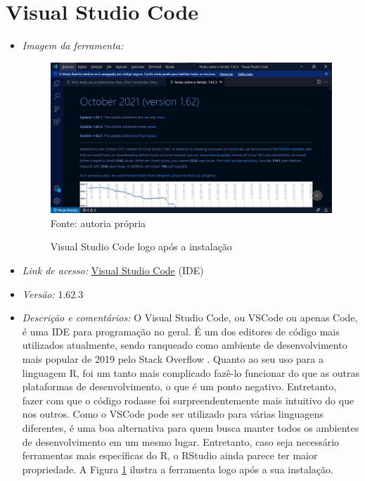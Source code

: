 \newpage
  \section{Visual Studio Code}
  
  \begin{itemize}
  	
  	\item \textit{Imagem da ferramenta:}
  	
  	\begin{figure}[H]  \label{Visual_Studio_Code}
  		\centering
  		\caption{Visual Studio Code logo após a instalação}
  		\includegraphics[width=16cm]{PicturesJoaoDias/Ferramentas/Visual Studio Code/Visual_Studio_Code-Tela_Inicial.png}
  		{\tiny \sf Fonte: autoria própria}
  	\end{figure}
  	
  \item \textit{Link de acesso:} \href{https://code.visualstudio.com/docs/?dv=win64}{Visual Studio Code} (IDE)
  	\item \textit{Versão:} 1.62.3
  	\item \textit{Descrição e comentários:}
  	  O Visual Studio Code, ou VSCode ou apenas Code, é uma IDE para programação no geral. É um dos editores de código mais utilizados atualmente, sendo ranqueado como ambiente de desenvolvimento mais popular de 2019 pelo Stack Overflow \cite{Overflow2019}. Quanto ao seu uso para a linguagem R, foi um tanto mais complicado fazê-lo funcionar do que as outras plataformas de desenvolvimento, o que é um ponto negativo. Entretanto, fazer com que o código rodasse foi surpreendentemente mais intuitivo do que nos outros. Como o VSCode pode ser utilizado para várias linguagens diferentes, é uma boa alternativa para quem busca manter todos os ambientes de desenvolvimento em um mesmo lugar. Entretanto, caso seja necessário ferramentas mais específicas do R, o RStudio ainda parece ter maior propriedade. A Figura \ref{Visual_Studio_Code} ilustra a ferramenta logo após a sua instalação.
  \end{itemize}
  		
